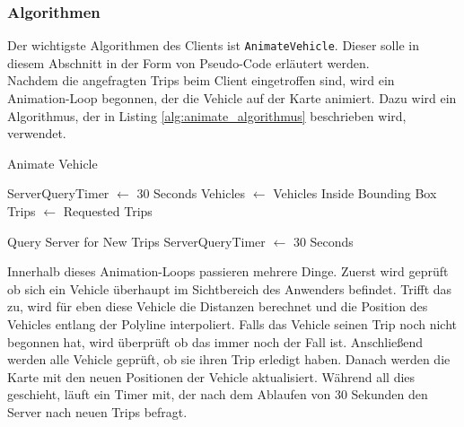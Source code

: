   \subsubsection*{Algorithmen}
  \label{ssub:algorithmen}
    Der wichtigste Algorithmen des Clients ist \texttt{AnimateVehicle}. Dieser solle in diesem Abschnitt in der Form von Pseudo-Code erläutert werden.\\

    Nachdem die angefragten Trips beim Client eingetroffen sind, wird ein Animation-Loop begonnen, der die Vehicle auf der Karte animiert. Dazu wird ein Algorithmus, der in Listing \ref{alg:animate_algorithmus} beschrieben wird, verwendet.

    \pagebreak
    \begin{algorithm}[H]
      \caption{Animate Vehicle}\label{alg:animate_algorithmus}
      \begin{algorithmic}[1]
          \State ServerQueryTimer $\gets$ 30 Seconds
          \State Vehicles $\gets$ Vehicles Inside Bounding Box
          \State Trips $\gets$ Requested Trips
             \EndFor

              \State Query Server for New Trips
              \State ServerQueryTimer $\gets$ 30 Seconds
            \EndIf

            \State {}
          \EndFunction
          
        \EndProcedure
      \end{algorithmic}
    \end{algorithm}

   Innerhalb dieses Animation-Loops passieren mehrere Dinge. Zuerst wird geprüft ob sich ein Vehicle überhaupt im Sichtbereich des Anwenders befindet. Trifft das zu, wird für eben diese Vehicle die Distanzen berechnet und die Position des Vehicles entlang der Polyline interpoliert. Falls das Vehicle seinen Trip noch nicht begonnen hat, wird überprüft ob das immer noch der Fall ist. Anschließend werden alle Vehicle geprüft, ob sie ihren Trip erledigt haben. Danach werden die Karte mit den neuen Positionen der Vehicle aktualisiert. Während all dies geschieht, läuft ein Timer mit, der nach dem Ablaufen von 30 Sekunden den Server nach neuen Trips befragt.


